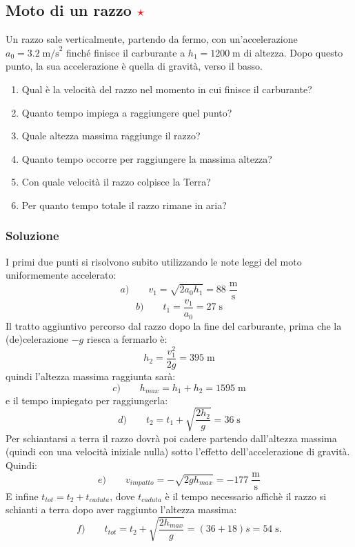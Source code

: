 \documentclass[12pt,a4paper]{book}
\newcommand{\rstar}{ \textcolor{red}{$\star$}}
\begin{document}
\subsection{Moto di un razzo \rstar}
Un razzo sale verticalmente, partendo da fermo, con un'accelerazione $a_{0}=3.2 \; \text{m/s}^2$ finché finisce il carburante a $h_{1}=1200\;\text{m}$ di altezza. Dopo questo punto, la sua accelerazione è quella di gravità, verso il basso.
\begin{enumerate}[label=\alph*)]
\item  Qual è la velocità del razzo nel momento in cui finisce il carburante?
\item Quanto tempo impiega a raggiungere quel punto?
\item Quale altezza massima raggiunge il razzo?
\item Quanto tempo occorre per raggiungere la massima altezza?
\item Con quale velocità il razzo colpisce la Terra?
\item Per quanto tempo totale il razzo rimane in aria?
\end{enumerate}


\subsubsection*{Soluzione}
I primi due punti si risolvono subito utilizzando le note leggi del moto uniformemente accelerato: 
\begin{equation*}
a) \qquad v_{1}=\sqrt{2a_{0}h_{1}}=88 \; \frac{\text{m}}{\text{s}}
\end{equation*}
\begin{equation*}
b)\qquad  t_{1}=\frac{v_{1}}{a_{0}}=27 \; \text{s}
\end{equation*}
Il tratto aggiuntivo percorso dal razzo dopo la fine del carburante, prima che la (de)celerazione $-g$ riesca a fermarlo è:
\begin{equation*}
h_{2}=\frac{v_{1}^2}{2g}=395 \;\text{m}
\end{equation*}
quindi l'altezza massima raggiunta sarà:
\begin{equation*}
c) \qquad h_{max}=h_{1}+h_{2}=1595 \; \text{m}
\end{equation*}
e il tempo impiegato per raggiungerla:
\begin{equation*}
d) \qquad t_{2}=t_{1}+\sqrt{\frac{2h_{2}}{g}}= 36 \; \text{s}
\end{equation*}
Per schiantarsi a terra il razzo dovrà poi cadere partendo dall'altezza massima (quindi con una velocità iniziale nulla) sotto l'effetto dell'accelerazione di gravità. Quindi:
\begin{equation*}
e) \qquad  v_{impatto}=-\sqrt{2gh_{max}}=-177 \; \frac{\text{m}}{\text{s}}
\end{equation*}
E infine $t_{tot}=t_{2}+t_{caduta}$, dove $t_{caduta}$ è il tempo necessario affichè il razzo si schianti a terra dopo aver raggiunto l'altezza massima:
\begin{equation*}
f)\qquad  t_{tot}=t_{2}+\sqrt{\frac{2h_{max}}{g}}=(36+18)s=54\;\text{s}.
\end{equation*}
\end{document}
